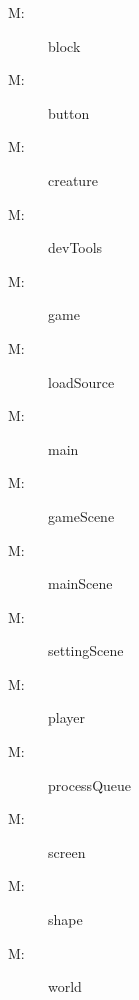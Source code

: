 \documentclass[12pt, titlepage]{article}
\newcounter{mnum}
\newcommand{\mthemnum}{M\themnum}
\begin{document}
\begin{description}

\item [ \mthemnum \label{mHH}:] block
\item [ \mthemnum \label{mHH}:] button
\item [ \mthemnum \label{mHH}:] creature
\item [ \mthemnum \label{mHH}:] devTools
\item [ \mthemnum \label{mHH}:] game
\item [ \mthemnum \label{mHH}:] loadSource
\item [ \mthemnum \label{mHH}:] main
\item [ \mthemnum \label{mHH}:] gameScene
\item [ \mthemnum \label{mHH}:] mainScene
\item [ \mthemnum \label{mHH}:] settingScene
\item [ \mthemnum \label{mHH}:] player
\item [ \mthemnum \label{mHH}:] processQueue
\item [ \mthemnum \label{mHH}:] screen
\item [ \mthemnum \label{mHH}:] shape
\item [ \mthemnum \label{mHH}:] world
\end{description}
\end{document}
